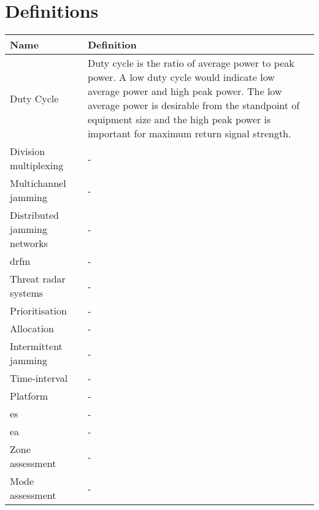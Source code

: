 %
        \chapter{Definitions} \label{app_def}%

\begin{longtable}{ | p{5cm} |  p{10cm} | }
    \hline
    \textbf{Name}           & \textbf{Definition}
    \\ \hline
    Duty Cycle              
    & Duty cycle is the ratio of average power to peak power.
    A low duty cycle would indicate low average power and high peak power.
    The low average power is desirable from the standpoint of equipment size and the high peak power is important for maximum return signal strength. 
    \\ \hline
    
    Division multiplexing   & - \\ \hline
    
    Multichannel jamming    & - \\ \hline
    
    Distributed jamming networks    & - \\ \hline
    
    \gls{drfm}              & - \\ \hline
    
    Threat radar systems    & - \\ \hline
    
    Prioritisation          & - \\ \hline
    
    Allocation              & - \\ \hline
    
    Intermittent jamming    & - \\ \hline
    
    Time-interval           & - \\ \hline
    
    Platform                & - \\ \hline
    
    \gls{es}                & - \\ \hline
    
    \gls{ea}                & - \\ \hline
    
    Zone assessment         & - \\ \hline
    
    Mode assessment         & - \\ \hline
    

\end{longtable}

